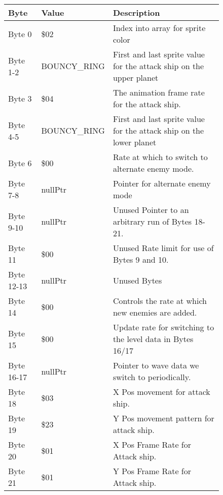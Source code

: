\begin{figure}[H]
{\begin{adjustbox}{width=12cm}
\begin{tabular}{lll}
\toprule
 Byte       & Value                     & Description                                                         \\
\midrule
 Byte 0     & \$02                       & Index into array for sprite color                                   \\
 Byte 1-2   & BOUNCY\_RING               & First and last sprite value for the attack ship on the upper planet \\
 Byte 3     & \$04                       & The animation frame rate for the attack ship.                       \\
 Byte 4-5   & BOUNCY\_RING               & First and last sprite value for the attack ship on the lower planet \\
 Byte 6     & \$00                       & Rate at which to switch to alternate enemy mode.                    \\
 Byte 7-8   & nullPtr                   & Pointer for alternate enemy mode                                    \\
 Byte 9-10  & nullPtr                   & Unused Pointer to an arbitrary run of Bytes 18-21.                  \\
 Byte 11    & \$00                       & Unused Rate limit for use of Bytes 9 and 10.                        \\
 Byte 12-13 & nullPtr                   & Unused Bytes                                                        \\
 Byte 14    & \$00                       & Controls the rate at which new enemies are added.                   \\
 Byte 15    & \$00                       & Update rate for switching to the level data in Bytes 16/17          \\
 Byte 16-17 & nullPtr                   & Pointer to wave data we switch to periodically.                     \\
 Byte 18    & \$03                       & X Pos movement for attack ship.                                     \\
 Byte 19    & \$23                       & Y Pos movement pattern for attack ship.                             \\
 Byte 20    & \$01                       & X Pos Frame Rate for Attack ship.                                   \\
 Byte 21    & \$01                       & Y Pos Frame Rate for Attack ship.                                   \\

\end{tabular}
\end{adjustbox}}
\end{figure}
